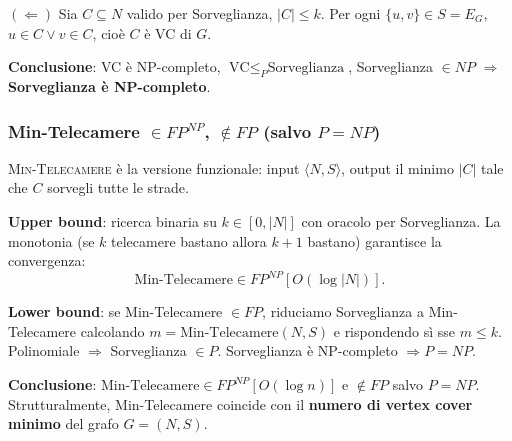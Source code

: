 \documentclass{report}
\begin{document}
$(\Leftarrow)$ Sia $C \subseteq N$ valido per Sorveglianza, $|C| \leq k$. Per ogni $\{u, v\} \in S = E_G$, $u \in C \vee v \in C$, cioè $C$ è VC di $G$.

\textbf{Conclusione}: VC è NP-completo, $\text{VC} \leq_P \text{Sorveglianza}$, Sorveglianza $\in NP$ $\Rightarrow$ \textbf{Sorveglianza è NP-completo}.

\subsubsection*{Min-Telecamere $\in FP^{NP}$, $\notin FP$ (salvo $P = NP$)}

\textsc{Min-Telecamere} è la versione funzionale: input $\langle N, S\rangle$, output il minimo $|C|$ tale che $C$ sorvegli tutte le strade.

\textbf{Upper bound}: ricerca binaria su $k \in [0, |N|]$ con oracolo per Sorveglianza. La monotonia (se $k$ telecamere bastano allora $k+1$ bastano) garantisce la convergenza:
\[
  \text{Min-Telecamere} \in FP^{NP}[O(\log |N|)].
\]

\textbf{Lower bound}: se Min-Telecamere $\in FP$, riduciamo Sorveglianza a Min-Telecamere calcolando $m = \text{Min-Telecamere}(N, S)$ e rispondendo sì sse $m \leq k$. Polinomiale $\Rightarrow$ Sorveglianza $\in P$. Sorveglianza è NP-completo $\Rightarrow P = NP$.

\textbf{Conclusione}: $\text{Min-Telecamere} \in FP^{NP}[O(\log n)]$ e $\notin FP$ salvo $P = NP$. Strutturalmente, Min-Telecamere coincide con il \textbf{numero di vertex cover minimo} del grafo $G = (N, S)$.
\end{document}
